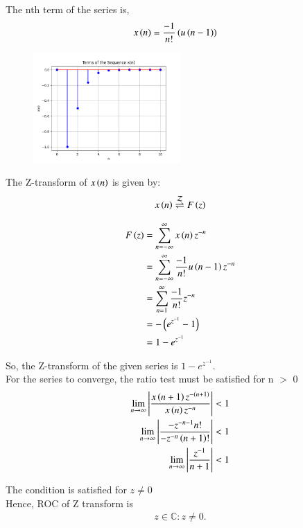 \documentclass[journal,12pt,twocolumn]{IEEEtran}
\begin{document}
The nth term of the series is,
\begin{align}
    x \left(n\right) & = \frac{-1}{n!}  \left(u \left(n-1\right)\right)
\end{align}

\begin{figure}
  \centering
  \includegraphics[width=0.5\textwidth]{plot.png}
\end{figure}

The Z-transform of $ x \left(n\right) $ is given by:
\begin{align}
	x \left(n\right) \overset{\mathcal{Z}}{ \rightleftharpoons} F \left(z\right) 
\end{align}

\begin{align}
    F \left(z\right) & = \sum_{n=-\infty}^{\infty} x \left(n\right)   z^{-n} \\
    & = \sum_{n=-\infty}^{\infty} \frac{-1}{n!}  u \left(n-1\right)   z^{-n} \\
    & = \sum_{n=1}^{\infty} \frac{-1}{n!}   z^{-n} \\
    & = -  \left(e^{z^{-1}} - 1\right) \\
    & = 1 - e^{z^{-1}}
\end{align}

So, the Z-transform of the given series is
$ 1 - e^{z^{-1}} $.\\

For the series to converge, the ratio test must be satisfied for n $>$ 0
\begin{align}
 \lim_{{n \to \infty}}  \left| \frac{x \left(n+1\right) z^{- \left(n+1\right)}}{x \left(n\right) z^{-n}}  \right| & <  1 \\
\lim_{{n \to \infty}}  \left| \frac{-z^{-n-1} n!}{-z^{-n}  \left(n+1\right)!} \right| & < 1\\
\lim_{{n \to \infty}}  \left| \frac{z^{-1}}{n+1}  \right| & < 1
\end{align}

The condition is satisfied for $ z \neq 0 $ \\

Hence, ROC of Z transform is 
\begin{align}
	z\in\mathbb{C} : z \neq 0.
\end{align}
\end{document}
